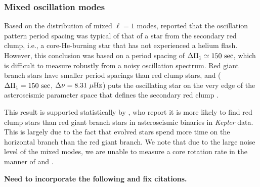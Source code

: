 \subsubsection{Mixed oscillation modes}
\label{subsubsec_mixed}
Based on the distribution of mixed $\ell = 1$ modes, \citet{gau14} reported that the oscillation pattern period spacing was typical of that of a star from the secondary red clump, i.e., a core-He-burning star that has not experienced a helium flash. However, this conclusion was based on a  period spacing of $\Delta \Pi_1 \simeq 150 \ \rm{sec}$, which is difficult to measure robustly from a noisy oscillation spectrum. Red giant branch stars have smaller period spacings than red clump stars, and ($\Delta \Pi_1 = 150 \ \rm{sec}$, $\Delta \nu = 8.31 \ \mu \rm{Hz}$) puts the oscillating star on the very edge of the asteroseismic parameter space that defines the secondary red clump \citep{mos14}.

 This result is supported statistically by \citet{mig14}, who report it is more likely to find red clump stars than red giant branch stars in asteroseismic binaries in \emph{Kepler} data. This is largely due to the fact that evolved stars spend more time on the horizontal branch than the red giant branch. We note that due to the large noise level of the mixed modes, we are unable to measure a core rotation rate in the manner of \citet{bec12} and \citet{mos12}. 

\textbf{Need to incorporate the following and fix citations.}

